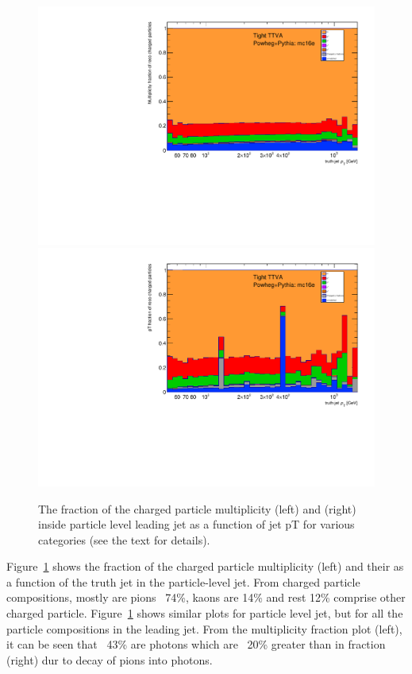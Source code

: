 \begin{figure}
\centering
\includegraphics[scale=0.3, page=2]{figures/jet_comp_study_powheg_Tight_MultiplicityFraction_mc16e.pdf}
\hspace{2mm}
\includegraphics[scale=0.3, page=2]{figures/jet_comp_study_powheg_Tight_pTFraction_mc16e.pdf}
\caption {The fraction of the charged particle multiplicity (left) and \pT (right) inside particle level leading jet as a function of jet pT for various categories (see the text for details).}
\label{fig:fraction of charged particles in truth jet}
\end{figure}

Figure~\ref{fig:fraction of charged particles in truth jet} shows the fraction of the charged particle multiplicity (left) and their \pT  as a function of the truth jet \pT in the particle-level jet. From charged particle compositions, mostly are pions ~74\%, kaons are 14\% and rest 12\% comprise other charged particle.
Figure~\ref{fig:fraction of charged particles in truth jet} shows similar plots for particle level jet, but for all the particle compositions in the leading jet. From the multiplicity fraction plot (left), it can be seen that ~43\% are photons which are ~20\% greater than in \pt fraction (right) dur to decay of pions into photons.


